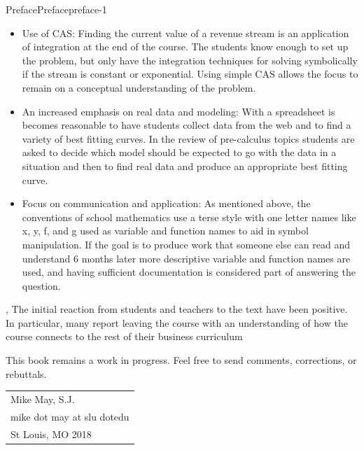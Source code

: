 \documentclass[oneside,10pt,]{book}
\numberwithin{equation}{section}
\begin{document}
\begin{preface}{Preface}{}{Preface}{}{}{preface-1}
\begin{itemize}[label=\textbullet]
\item{}\hypertarget{p-23}{}%
Use of CAS: Finding the current value of a revenue stream is an application of integration at the end of the course. The students know enough to set up the problem, but only have the integration techniques for solving symbolically if the stream is constant or exponential. Using simple CAS allows the focus to remain on a conceptual understanding of the problem.%
\item{}\hypertarget{p-24}{}%
An increased emphasis on real data and modeling: With a spreadsheet is becomes reasonable to have students collect data from the web and to find a variety of best fitting curves. In the review of pre-calculus topics students are asked to decide which model should be expected to go with the data in a situation and then to find real data and produce an appropriate best fitting curve.%
\item{}\hypertarget{p-25}{}%
Focus on communication and application: As mentioned above, the conventions of school mathematics use a terse style with one letter names like x, y, f, and g used as variable and function names to aid in symbol manipulation. If the goal is to produce work that someone else can read and understand 6 months later more descriptive variable and function names are used, and having sufficient documentation is considered part of answering the question.%
\end{itemize}
 , \hypertarget{p-26}{}%
The initial reaction from students and teachers to the text have been positive.  In particular, many report leaving the course with an understanding of how the course connects to the rest of their business curriculum%
\par
\hypertarget{p-27}{}%
This book remains a work in progress.  Feel free to send comments, corrections, or rebuttals.%
\nopagebreak\par%
\hfill\begin{tabular}[t]{l@{}}
Mike May, S.J.\\
mike dot may at slu dotedu\\
St Louis, MO 2018
\end{tabular}\\\par
\end{preface}
\setcounter{tocdepth}{1}
\renewcommand*\contentsname{Contents}
\tableofcontents
\mainmatter
%
%
\typeout{************************************************}
\end{document}

